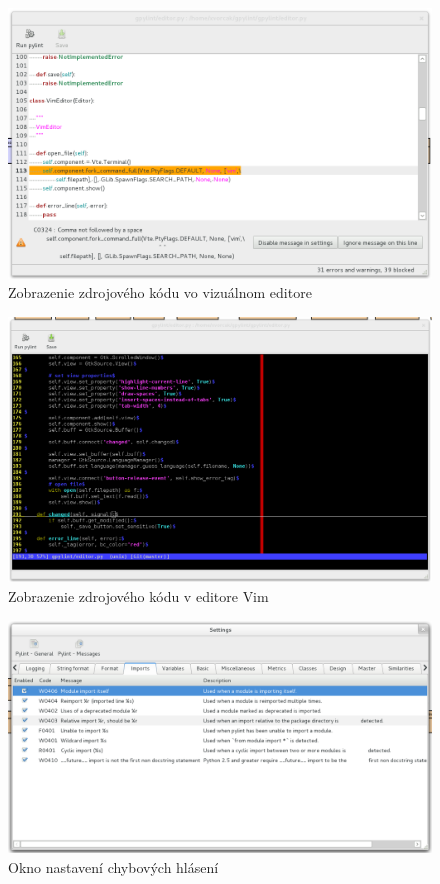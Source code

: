 \documentclass[11pt,oneside,final]{fithesis2}
\begin{document}
	\begin{figure}[htb]
	 \centering
	 \includegraphics[width=\textwidth]{images/code_window}
	 \caption{Zobrazenie zdrojového kódu vo vizuálnom editore}
	\end{figure}
			    
	\begin{figure}[htb]
	 \centering
	 \includegraphics[width=\textwidth]{images/vim_editor}
	 \caption{Zobrazenie zdrojového kódu v editore Vim}
	\end{figure}
	
	\begin{figure}[htb]
	 \centering
	 \includegraphics[width=\textwidth]{images/settings}
	 \caption{Okno nastavení chybových hlásení}
	\end{figure}
		
\end{document}
